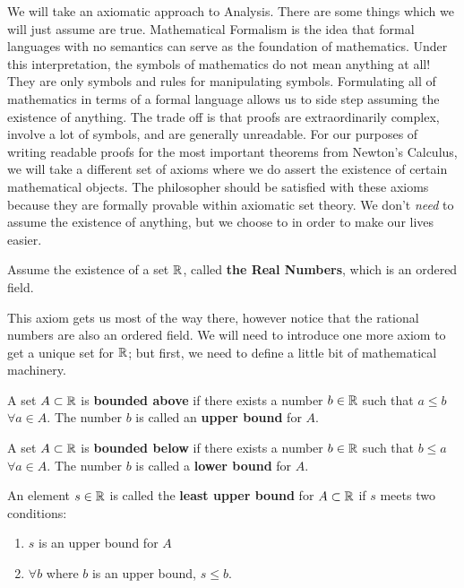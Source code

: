 
 



We will take an axiomatic approach to Analysis. There are some things which we will just assume are true. Mathematical Formalism is the idea that formal languages with no semantics can serve as the foundation of mathematics. Under this interpretation, the symbols of mathematics do not mean anything at all! They are only symbols and rules for manipulating symbols. Formulating all of mathematics in terms of a formal language allows us to side step assuming the existence of anything. The trade off is that proofs are extraordinarily complex, involve a lot of symbols, and are generally unreadable. For our purposes of writing readable proofs for the most important theorems from Newton's Calculus, we will take a different set of axioms where we do assert the existence of certain mathematical objects. The philosopher should be satisfied with these axioms because they are formally provable within axiomatic set theory. We don't \textit{need} to assume the existence of anything, but we choose to in order to  make our lives easier.
\begin{axiom}
	Assume the existence of a set $\mathbb{R}$, called \textbf{the Real Numbers}, which is an ordered field.	
\end{axiom}

This axiom gets us most of the way there, however notice that the rational numbers are also an ordered field. We will need to introduce one more axiom to get a unique set for $\mathbb{R}$; but first, we need to define a little bit of mathematical machinery.

\begin{definition}
	A set $A \subset \mathbb{R}$ is \textbf{bounded above} if there exists a number $b \in \mathbb{R}$ such that $a \le b$ $\forall a \in A$. The number $b$ is called an \textbf{upper bound} for $A$.
\end{definition}

\begin{definition}
	A set $A \subset \mathbb{R}$ is \textbf{bounded below} if there exists a number $b \in \mathbb{R}$ such that $b \le a$ $\forall a \in A$. The number $b$ is called a \textbf{lower bound} for $A$.
\end{definition}

\begin{definition}
	An element $s \in \mathbb{R}$ is called the \textbf{least upper bound} for $A \subset \mathbb{R}$ if $s$ meets two conditions:
	\begin{enumerate}
		\item $s$ is an upper bound for $A$
		\item $\forall b$ where $b$ is an upper bound, $s \le b$.
	\end{enumerate}
\end{definition}

